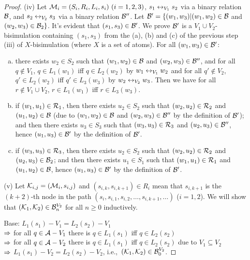 \documentclass{article}
\begin{document}
\begin{proof}
 (iv) Let ${\cal M}_i=(S_i,R_i,L_i,s_i)~(i=1,2,3)$, $s_1 \leftrightarrow_{V_1} s_2$ via a binary relation ${\cal B}$, and $s_2 \leftrightarrow_{V_2} s_3$ via a binary relation ${\cal B}''$. Let ${\cal B}' = \{(w_1, w_3)| (w_1, w_2)\in {\cal B}$ and $(w_2, w_3)\in {\cal B}_2\}$. It's evident that $(s_1, s_3) \in {\cal B}'$. We prove ${\cal B}'$ is a $V_1 \cup V_2$-bisimulation containing $(s_1, s_3)$ from the (a), (b) and (c) of the previous step (iii) of $X$-bisimulation (where $X$ is a set of atoms). For all $(w_1, w_3) \in {\cal B}'$:
 \begin{enumerate}[(a)]
   \item there exists $w_2 \in S_2$ such that $(w_1,w_2)\in {\cal B}$ and $(w_2, w_3)\in {\cal B}''$, and for all $q \notin V_1$, $q \in L_1(w_1)$ iff $q \in L_2(w_2)$ by $w_1 \leftrightarrow_{V_1} w_2$ and for all $q' \notin V_2$, $q'\in L_2(w_2)$ iff $q'\in L_3(w_3)$ by $w_2 \leftrightarrow_{V_2} w_3$. Then we have for all $r\notin V_1 \cup V_2$, $r \in L_1(w_1)$ iff $r \in L_3(w_3)$.
   \item if $(w_1, u_1) \in {\cal R}_1$, then there exists $u_2\in S_2$ such that $(w_2, u_2) \in {\cal R}_2$ and $(u_1,u_2)\in {\cal B}$ (due to $(w_1,w_2)\in {\cal B}$ and $(w_2, w_3) \in {\cal B}''$ by the definition of ${\cal B}'$); and then there exists $u_3 \in S_3$ such that $(w_3, u_3) \in {\cal R}_3$ and $(u_2, u_3) \in {\cal B}''$, hence $(u_1, u_3) \in {\cal B}'$ by the definition of ${\cal B}'$.
   \item if $(w_3, u_3) \in {\cal R}_3$, then there exists $u_2\in S_2$ such that $(w_2, u_2) \in {\cal R}_2$ and $(u_2, u_3) \in {\cal B}_2$; and then there exists $u_1 \in S_1$ such that $(w_1, u_1) \in {\cal R}_1$ and $(u_1, u_2) \in {\cal B}$, hence $(u_1, u_3) \in {\cal B}'$ by the definition of ${\cal B}'$.
 \end{enumerate}

 (v) Let ${\cal K}_{i, j}=({\cal M}_i, s_{i,j})$ and $(s_{i, k}, s_{i, k+1}) \in R_i$ mean that $s_{i, k+1}$ is the $(k+2)$-th node in the path
  $(s_i, s_{i, 1}, s_{i,2}, \dots , s_{i, k+1}, \dots)$ ($i=1,2$).
 We will show that $({\cal K}_1, {\cal K}_2) \in {\cal B}_n^{V_2}$ for all $n \ge 0$ inductively.

 Base: $L_1(s_1) - V_1 = L_2(s_2) - V_1$\\
 $\Rightarrow$ for all $q \in {\cal A} - V_1$ there is $q \in L_1(s_1)$ iff $q \in L_2(s_2)$\\
 $\Rightarrow$ for all $q \in {\cal A} - V_2$ there is $q \in L_1(s_1)$ iff $q \in L_2(s_2)$ due to $V_1 \subseteq V_2$\\
 $\Rightarrow$ $L_1(s_1) - V_2 = L_2(s_2) - V_2$, i.e.,\ $({\cal K}_1, {\cal K}_2) \in {\cal B}_0^{V_2}$.


\end{proof}
\end{document}
